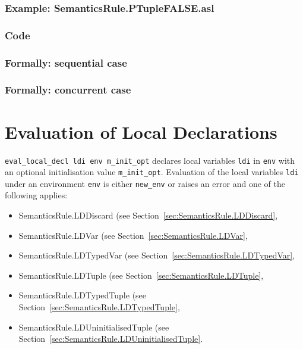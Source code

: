 \documentclass{book}
\begin{document}
    \subsection{Example: SemanticsRule.PTupleFALSE.asl}

  \subsection{Code}

\begin{emptyformal}
  \subsection{Formally: sequential case}

  \subsection{Formally: concurrent case}
\end{emptyformal}


\chapter{Evaluation of Local Declarations \label{chap:eval_local_decl}}

\texttt{eval\_local\_decl ldi env m\_init\_opt} declares local variables
\texttt{ldi} in \texttt{env} with an optional initialisation value
\texttt{m\_init\_opt}.  Evaluation of the local variables \texttt{ldi}
under an environment \texttt{env} is either \texttt{new\_env} or raises an
error and one of the following applies:
\begin{itemize}
\item SemanticsRule.LDDiscard (see Section~\ref{sec:SemanticsRule.LDDiscard},
\item SemanticsRule.LDVar (see Section~\ref{sec:SemanticsRule.LDVar},
\item SemanticsRule.LDTypedVar (see Section~\ref{sec:SemanticsRule.LDTypedVar},
\item SemanticsRule.LDTuple (see Section~\ref{sec:SemanticsRule.LDTuple},
\item SemanticsRule.LDTypedTuple (see Section~\ref{sec:SemanticsRule.LDTypedTuple},
\item SemanticsRule.LDUninitialisedTuple (see Section~\ref{sec:SemanticsRule.LDUninitialisedTuple}.
\end{itemize}
\end{document}
